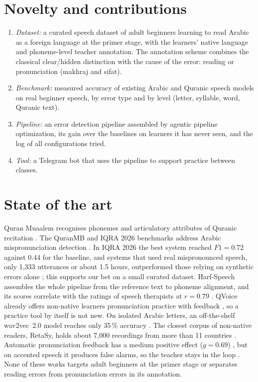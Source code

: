 \documentclass[a4paper,14pt]{extarticle}
\begin{document}
\section{Novelty and contributions}

\begin{enumerate}
  \item \emph{Dataset:} a curated speech dataset of adult beginners learning to read Arabic as a foreign
    language at the primer stage, with the learners' native language and phoneme-level teacher
    annotation. The annotation scheme combines the classical clear/hidden distinction with the cause of
    the error: reading or pronunciation (makhraj and sifat).
  \item \emph{Benchmark:} measured accuracy of existing Arabic and Quranic speech models on real beginner
    speech, by error type and by level (letter, syllable, word, Quranic text).
  \item \emph{Pipeline:} an error detection pipeline assembled by agentic pipeline optimization, its gain
    over the baselines on learners it has never seen, and the log of all configurations tried.
  \item \emph{Tool:} a Telegram bot that uses the pipeline to support practice between classes.
\end{enumerate}

\section{State of the art}

Quran Muaalem recognises phonemes and articulatory attributes of Quranic recitation \cite{SRC-002}. The
QuranMB and IQRA 2026 benchmarks address Arabic mispronunciation detection \cite{SRC-004,SRC-031}. In
IQRA 2026 the best system reached $F1=0.72$ against 0.44 for the baseline, and systems that used real
mispronounced speech, only 1,333 utterances or about 1.5 hours, outperformed those relying on synthetic errors
alone \cite{SRC-031}; this supports our bet on a small curated dataset. Harf-Speech assembles the whole
pipeline from the reference text to phoneme alignment, and its scores correlate with the ratings of speech
therapists at $r=0.79$ \cite{SRC-149}. QVoice already offers non-native learners pronunciation practice with
feedback \cite{SRC-150}, so a practice tool by itself is not new. On isolated Arabic letters, an off-the-shelf
wav2vec~2.0 model reaches only 35\,\% accuracy \cite{SRC-151}. The closest corpus of non-native readers,
RetaSy, holds about 7,000 recordings from more than 11 countries \cite{SRC-032}. Automatic pronunciation
feedback has a medium positive effect ($g=0.69$) \cite{SRC-025}, but on accented speech it produces false
alarms, so the teacher stays in the loop \cite{SRC-026}. None of these works targets adult beginners at the
primer stage or separates reading errors from pronunciation errors in its annotation.
\end{document}
